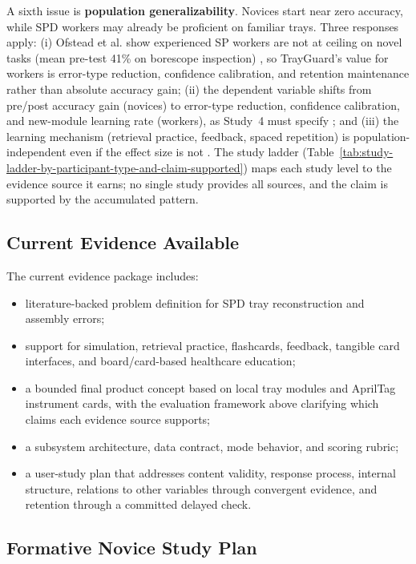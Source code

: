 \documentclass[10pt,a4paper]{article}
\begin{document}
A sixth issue is \textbf{population generalizability}. Novices start near zero
accuracy, while SPD workers may already be proficient on familiar trays.
Three responses apply: (i) Ofstead et al. show experienced SP workers are not
at ceiling on novel tasks (mean pre-test 41\% on borescope inspection)
\cite{ofstead-et-al-2023}, so TrayGuard's value for workers is error-type
reduction, confidence calibration, and retention maintenance rather than
absolute accuracy gain; (ii) the dependent variable shifts from pre/post
accuracy gain (novices) to error-type reduction, confidence calibration, and
new-module learning rate (workers), as Study~4 must specify
\cite{kirkpatrick-evaluation-1994}; and (iii) the learning mechanism (retrieval
practice, feedback, spaced repetition) is population-independent even if the
effect size is not \cite{arthur-et-al-2003, roediger-and-karpicke-2006,
dunlosky-et-al-2013, larsen-et-al-2009}. The study ladder
(Table~\ref{tab:study-ladder-by-participant-type-and-claim-supported}) maps
each study level to the evidence source it earns; no single study provides all
sources, and the claim is supported by the accumulated pattern.

\subsection{Current Evidence Available}

The current evidence package includes:
\begin{itemize}
  \item literature-backed problem definition for SPD tray reconstruction and assembly errors;
  \item support for simulation, retrieval practice, flashcards, feedback, tangible card interfaces, and board/card-based healthcare education;
  \item a bounded final product concept based on local tray modules and AprilTag instrument cards, with the evaluation framework above clarifying which claims each evidence source supports;
  \item a subsystem architecture, data contract, mode behavior, and scoring rubric;
  \item a user-study plan that addresses content validity, response process, internal structure, relations to other variables through convergent evidence, and retention through a committed delayed check.
\end{itemize}
\subsection{Formative Novice Study Plan}
\end{document}
